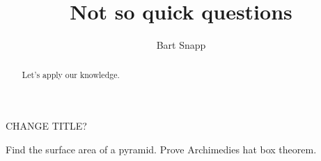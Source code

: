 \documentclass[handout,nooutcomes,noauthor]{ximera}
\title{Not so quick questions}
\author{Bart Snapp}
\begin{document}
\begin{abstract}
  Let's apply our knowledge.
\end{abstract}
\maketitle


\begin{listOutcomes}
\item 
\end{listOutcomes}


\mynewpage



CHANGE TITLE?

Find the surface area of a pyramid.
Prove Archimedies hat box theorem.



\begin{question}
  
\end{question}

\mynewpage
\end{document}
